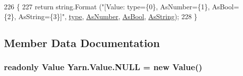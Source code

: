 \begin{DoxyCode}
226         \{
227             \textcolor{keywordflow}{return} string.Format (\textcolor{stringliteral}{"[Value: type=\{0\}, AsNumber=\{1\}, AsBool=\{2\}, AsString=\{3\}]"}, 
      \hyperlink{a00100_a6d5820fafa766911b9da84d1ed33e51a}{type}, \hyperlink{a00100_a751419743761562bf902246d6e6a3c0a}{AsNumber}, \hyperlink{a00100_a5805faef3b3d376090ff096d6dd6c064}{AsBool}, \hyperlink{a00100_a2d5d0ec41c50c642c1d0eeeb6bb2b1c0}{AsString});
228         \}
\end{DoxyCode}


\subsection{Member Data Documentation}
\hypertarget{a00100_a1ed2964965baca8621c45efa23f37660}{
\subsubsection[{N\-U\-L\-L}]{\setlength{\rightskip}{0pt plus 5cm}readonly {\bf Value} Yarn.\-Value.\-N\-U\-L\-L = new {\bf Value}()\hspace{0.3cm}{\ttfamily [static]}}}\label{a00100_a1ed2964965baca8621c45efa23f37660}


